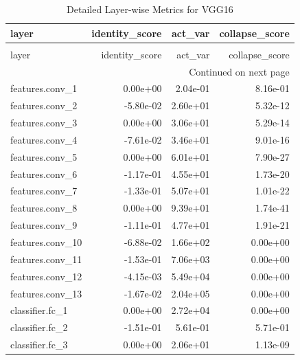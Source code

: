 \begin{longtable}{lrrr}
\caption{Detailed Layer-wise Metrics for VGG16} \label{tab:layer_metrics_vgg16} \\
\toprule
layer & identity_score & act_var & collapse_score \\
\midrule
\endfirsthead
\caption[]{Detailed Layer-wise Metrics for VGG16} \\
\toprule
layer & identity_score & act_var & collapse_score \\
\midrule
\endhead
\midrule
\multicolumn{4}{r}{Continued on next page} \\
\midrule
\endfoot
\bottomrule
\endlastfoot
features.conv_1 & 0.00e+00 & 2.04e-01 & 8.16e-01 \\
features.conv_2 & -5.80e-02 & 2.60e+01 & 5.32e-12 \\
features.conv_3 & 0.00e+00 & 3.06e+01 & 5.29e-14 \\
features.conv_4 & -7.61e-02 & 3.46e+01 & 9.01e-16 \\
features.conv_5 & 0.00e+00 & 6.01e+01 & 7.90e-27 \\
features.conv_6 & -1.17e-01 & 4.55e+01 & 1.73e-20 \\
features.conv_7 & -1.33e-01 & 5.07e+01 & 1.01e-22 \\
features.conv_8 & 0.00e+00 & 9.39e+01 & 1.74e-41 \\
features.conv_9 & -1.11e-01 & 4.77e+01 & 1.91e-21 \\
features.conv_10 & -6.88e-02 & 1.66e+02 & 0.00e+00 \\
features.conv_11 & -1.53e-01 & 7.06e+03 & 0.00e+00 \\
features.conv_12 & -4.15e-03 & 5.49e+04 & 0.00e+00 \\
features.conv_13 & -1.67e-02 & 2.04e+05 & 0.00e+00 \\
classifier.fc_1 & 0.00e+00 & 2.72e+04 & 0.00e+00 \\
classifier.fc_2 & -1.51e-01 & 5.61e-01 & 5.71e-01 \\
classifier.fc_3 & 0.00e+00 & 2.06e+01 & 1.13e-09 \\
\end{longtable}
